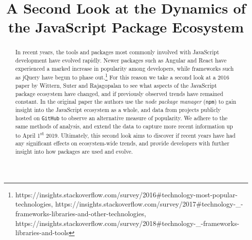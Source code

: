 \documentclass[10pt,conference]{IEEEtran}
\def\code#1{\texttt{#1}}
\begin{document}
\title{A Second Look at the Dynamics of the JavaScript Package Ecosystem\\}

\author{
}


\maketitle

\begin{abstract}
In recent years, the tools and packages most commonly involved with JavaScript development have evolved rapidly.
Newer packages such as Angular and React have experienced a marked increase in popularity among developers, while frameworks such as jQuery
have begun to phase out.\footnote{\label{adoption}https://insights.stackoverflow.com/survey/2016\#technology-most-popular-technologies, 
https://insights.stackoverflow.com/survey/2017\#technology-\_-frameworks-libraries-and-other-technologies, https://insights.stackoverflow.com/survey/2018\#technology-\_-frameworks-libraries-and-tools}
For this reason we take a second look at a 2016 paper by Wittern, Suter and Rajagopalan \cite{Wittern:2016} to see what aspects of the JavaScript package ecosystem have changed, 
and if previously observed trends have remained constant.
In the original paper the authors use the \emph{node package manager} (\code{npm}) to gain 
insight into the JavaScript ecosystem as a whole, and data from projects publicly hosted on \code{GitHub} to observe an alternative measure of popularity. We adhere to the same methods of analysis, and extend the data to capture
more recent information up to April 1\textsuperscript{st} 2019.
Ultimately, this second look aims to discover if recent years have had any significant effects on ecosystem-wide trends, and provide developers with further insight into how packages are used and evolve.
\end{abstract}
\end{document}
